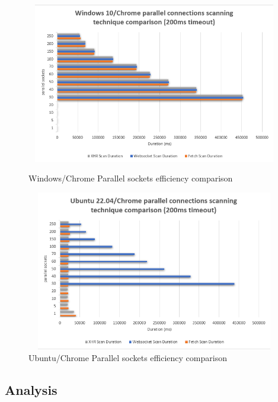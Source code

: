 \begin{figure}[ht]
\begin{adjustwidth}{-3cm}{-1cm}
\centering
\begin{minipage}{.45\textwidth}
  \centering
\includegraphics[width=12cm, height=7cm, keepaspectratio]{port_scanning_techniques/img/windows_chrome_scan_technique_comparison.png}
    \caption{Windows/Chrome Parallel sockets efficiency comparison}
    \label{fig:windows_chrome_n_sockets}
\end{minipage}
\hspace{0.5cm}
\begin{minipage}{.45\textwidth}
\includegraphics[width=12cm, height=7cm, keepaspectratio]{port_scanning_techniques/img/ubuntu_chrome_scan_technique_comparison.png}
    \caption{Ubuntu/Chrome Parallel sockets efficiency comparison}
    \label{fig:ubuntu_chrome_n_sockets}
\end{minipage}
\end{adjustwidth}
\end{figure}


\subsection{Analysis}

